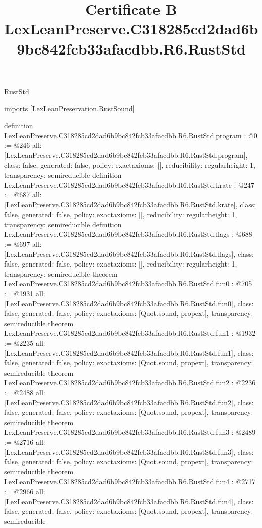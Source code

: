 \begin{lexlean}{RustStd}
\title{Certificate B LexLeanPreserve.C318285cd2dad6b9bc842fcb33afacdbb.R6.RustStd}
\begin{coremodule}
imports [LexLeanPreservation.RustSound]

definition LexLeanPreserve.C318285cd2dad6b9bc842fcb33afacdbb.R6.RustStd.program : @0 := @246 {
  all: [LexLeanPreserve.C318285cd2dad6b9bc842fcb33afacdbb.R6.RustStd.program],
  class: false,
  generated: false,
  policy: exact{axioms: []},
  reducibility: regular{height: 1},
  transparency: semireducible
}
definition LexLeanPreserve.C318285cd2dad6b9bc842fcb33afacdbb.R6.RustStd.krate : @247 := @687 {
  all: [LexLeanPreserve.C318285cd2dad6b9bc842fcb33afacdbb.R6.RustStd.krate],
  class: false,
  generated: false,
  policy: exact{axioms: []},
  reducibility: regular{height: 1},
  transparency: semireducible
}
definition LexLeanPreserve.C318285cd2dad6b9bc842fcb33afacdbb.R6.RustStd.flags : @688 := @697 {
  all: [LexLeanPreserve.C318285cd2dad6b9bc842fcb33afacdbb.R6.RustStd.flags],
  class: false,
  generated: false,
  policy: exact{axioms: []},
  reducibility: regular{height: 1},
  transparency: semireducible
}
theorem LexLeanPreserve.C318285cd2dad6b9bc842fcb33afacdbb.R6.RustStd.fun0 : @705 := @1931 {
  all: [LexLeanPreserve.C318285cd2dad6b9bc842fcb33afacdbb.R6.RustStd.fun0],
  class: false,
  generated: false,
  policy: exact{axioms: [Quot.sound, propext]},
  transparency: semireducible
}
theorem LexLeanPreserve.C318285cd2dad6b9bc842fcb33afacdbb.R6.RustStd.fun1 : @1932 := @2235 {
  all: [LexLeanPreserve.C318285cd2dad6b9bc842fcb33afacdbb.R6.RustStd.fun1],
  class: false,
  generated: false,
  policy: exact{axioms: [Quot.sound, propext]},
  transparency: semireducible
}
theorem LexLeanPreserve.C318285cd2dad6b9bc842fcb33afacdbb.R6.RustStd.fun2 : @2236 := @2488 {
  all: [LexLeanPreserve.C318285cd2dad6b9bc842fcb33afacdbb.R6.RustStd.fun2],
  class: false,
  generated: false,
  policy: exact{axioms: [Quot.sound, propext]},
  transparency: semireducible
}
theorem LexLeanPreserve.C318285cd2dad6b9bc842fcb33afacdbb.R6.RustStd.fun3 : @2489 := @2716 {
  all: [LexLeanPreserve.C318285cd2dad6b9bc842fcb33afacdbb.R6.RustStd.fun3],
  class: false,
  generated: false,
  policy: exact{axioms: [Quot.sound, propext]},
  transparency: semireducible
}
theorem LexLeanPreserve.C318285cd2dad6b9bc842fcb33afacdbb.R6.RustStd.fun4 : @2717 := @2966 {
  all: [LexLeanPreserve.C318285cd2dad6b9bc842fcb33afacdbb.R6.RustStd.fun4],
  class: false,
  generated: false,
  policy: exact{axioms: [Quot.sound, propext]},
  transparency: semireducible
}
\end{coremodule}
\end{lexlean}
